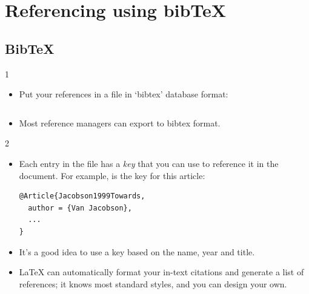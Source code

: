 \documentclass[10pt,times]{beamer}
\begin{document}
\section{Referencing using bib\TeX}
\subsection{Bib\TeX}
\begin{frame}[fragile]{\insertsubsection{} 1}
\begin{itemize}
\item Put your references in a  file in `bibtex' database format:
\inputminted[fontsize=\scriptsize,frame=single]{latex}{bib-example.bib}
\item Most reference managers can export to bibtex format.
\end{itemize}
\end{frame}


\begin{frame}[fragile]{\insertsubsection{} 2}
\begin{itemize}
\item Each entry in the  file has a \emph{key} that you can use to
reference it in the document. For example,  is the 
key for this article:
\begin{verbatim}
@Article{Jacobson1999Towards,
  author = {Van Jacobson},
  ...
}
\end{verbatim}
\item It's a good idea to use a key based on the name, year and title.
\item \LaTeX{} can automatically format your in-text citations and generate a
list of references; it knows most standard styles, and you can design your own.
\end{itemize}
\end{frame}
\end{document}
